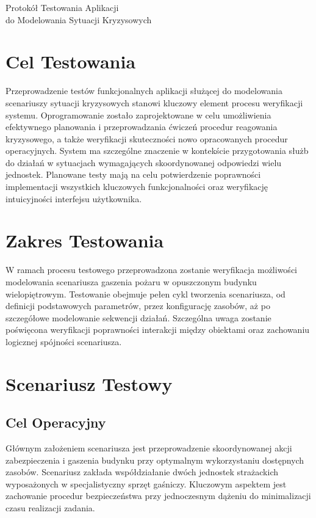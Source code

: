 \newpage
\begin{center}
    \huge Protokół Testowania Aplikacji\\
    \large do Modelowania Sytuacji Kryzysowych\\
\end{center}
\section{Cel Testowania}
Przeprowadzenie testów funkcjonalnych aplikacji służącej do modelowania scenariuszy sytuacji kryzysowych stanowi kluczowy element procesu weryfikacji systemu. Oprogramowanie zostało zaprojektowane w celu umożliwienia efektywnego planowania i przeprowadzania ćwiczeń procedur reagowania kryzysowego, a także weryfikacji skuteczności nowo opracowanych procedur operacyjnych. System ma szczególne znaczenie w kontekście przygotowania służb do działań w sytuacjach wymagających skoordynowanej odpowiedzi wielu jednostek. Planowane testy mają na celu potwierdzenie poprawności implementacji wszystkich kluczowych funkcjonalności oraz weryfikację intuicyjności interfejsu użytkownika.
\section{Zakres Testowania}
W ramach procesu testowego przeprowadzona zostanie weryfikacja możliwości modelowania scenariusza gaszenia pożaru w opuszczonym budynku wielopiętrowym. Testowanie obejmuje pełen cykl tworzenia scenariusza, od definicji podstawowych parametrów, przez konfigurację zasobów, aż po szczegółowe modelowanie sekwencji działań. Szczególna uwaga zostanie poświęcona weryfikacji poprawności interakcji między obiektami oraz zachowaniu logicznej spójności scenariusza.
\section{Scenariusz Testowy}
\subsection{Cel Operacyjny}
Głównym założeniem scenariusza jest przeprowadzenie skoordynowanej akcji zabezpieczenia i gaszenia budynku przy optymalnym wykorzystaniu dostępnych zasobów. Scenariusz zakłada współdziałanie dwóch jednostek strażackich wyposażonych w specjalistyczny sprzęt gaśniczy. Kluczowym aspektem jest zachowanie procedur bezpieczeństwa przy jednoczesnym dążeniu do minimalizacji czasu realizacji zadania.

